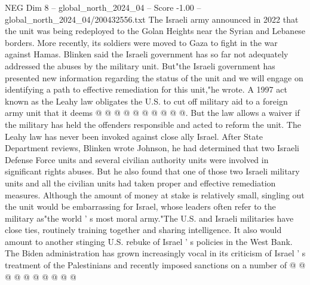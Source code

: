 \begin{textsample}{NEG Dim 8 – global\_north\_2024\_04 – Score -1.00 – global\_north\_2024\_04/200432556.txt}
The Israeli army announced in 2022 that the unit was being redeployed to the Golan Heights near the Syrian and Lebanese borders.
More recently, its soldiers were moved to Gaza to fight in the war against Hamas.
Blinken said the Israeli government has so far not adequately addressed the abuses by the military unit.
But"the Israeli government has presented new information regarding the status of the unit and we will engage on identifying a path to effective remediation for this unit,"he wrote.
A 1997 act known as the Leahy law obligates the U.S. to cut off military aid to a foreign army unit that it deems @ @ @ @ @ @ @ @ @ @.
But the law allows a waiver if the military has held the offenders responsible and acted to reform the unit.
The Leahy law has never been invoked against close ally Israel.
After State Department reviews, Blinken wrote Johnson, he had determined that two Israeli Defense Force units and several civilian authority units were involved in significant rights abuses.
But he also found that one of those two Israeli military units and all the civilian units had taken proper and effective remediation measures.
Although the amount of money at stake is relatively small, singling out the unit would be embarrassing for Israel, whose leaders often refer to the military as"the world ' s most moral army."The U.S. and Israeli militaries have close ties, routinely training together and sharing intelligence.
It also would amount to another stinging U.S. rebuke of Israel ' s policies in the West Bank.
The Biden administration has grown increasingly vocal in its criticism of Israel ' s treatment of the Palestinians and recently imposed sanctions on a number of @ @ @ @ @ @ @ @ @ @

\end{textsample}
